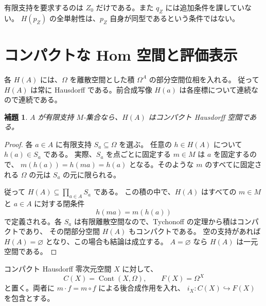 \documentclass[a4paper,11pt]{ltjsarticle}
\theoremstyle{japaneseplain}
\newtheorem{lemma}[theorem]{補題}
\newcommand{\Cont}{\operatorname{Cont}}
\begin{document}
有限支持を要求するのは $Z_0$ だけである。また $q_Z$ には追加条件を課していない。
$H(p_Z)$ の全単射性は、$p_Z$ 自身が同型であるという条件ではない。

\section{コンパクトな Hom 空間と評価表示}\label{sec:duality}

各 $H(A)$ には、$\Omega$ を離散空間とした積 $\Omega^A$ の部分空間位相を入れる。
従って $H(A)$ は常に Hausdorff である。前合成写像 $H(a)$ は各座標について連続なので連続である。

\begin{lemma}\label{lem:compactH}
$A$ が有限支持 $M$-集合なら、$H(A)$ はコンパクト Hausdorff 空間である。
\end{lemma}
\begin{proof}
各 $a\in A$ に有限支持 $S_a\subseteq\Omega$ を選ぶ。
任意の $h\in H(A)$ について $h(a)\in S_a$ である。
実際、$S_a$ を点ごとに固定する $m\in M$ は $a$ を固定するので、
$m(h(a))=h(ma)=h(a)$ となる。そのような $m$ のすべてに固定される $\Omega$ の元は
$S_a$ の元に限られる。

従って $H(A)\subseteq\prod_{a\in A}S_a$ である。
この積の中で、$H(A)$ はすべての $m\in M$ と $a\in A$ に対する閉条件
\[
 h(ma)=m(h(a))
\]
で定義される。各 $S_a$ は有限離散空間なので、Tychonoff の定理から積はコンパクトであり、
その閉部分空間 $H(A)$ もコンパクトである。
空の支持があれば $H(A)=\varnothing$ となり、この場合も結論は成立する。
$A=\varnothing$ なら $H(A)$ は一元空間である。
\end{proof}

コンパクト Hausdorff 零次元空間 $X$ に対して、
\[
 C(X)=\Cont(X,\Omega),\qquad F(X)=\Omega^X
\]
と置く。両者に $m\cdot f=m\circ f$ による後合成作用を入れ、
$i_X:C(X)\hookrightarrow F(X)$ を包含とする。
\end{document}
